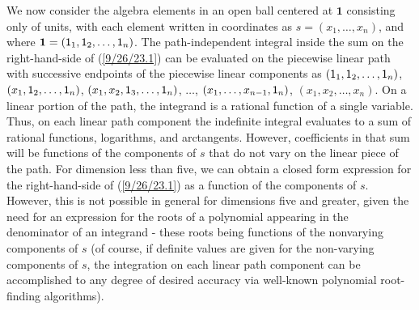 \documentclass{amsart}
\numberwithin{equation}{section}
\theoremstyle{definition}
\numberwithin{theorem}{section}
\begin{document}
We now consider the algebra elements in an open ball centered at $\mathbf{1}$ consisting only of units, with each element written in coordinates as $s = (x_1,\dots,x_n)$, and where $\mathbf{1} = ({\sf 1}_1,{\sf 1}_2,\dots,{\sf 1}_n)$.  The path-independent integral inside the sum on the right-hand-side of (\ref{9/26/23.1}) can be evaluated on the piecewise linear path with successive endpoints of the piecewise linear components as  $({\sf 1}_1,{\sf 1}_2,\dots,{\sf 1}_n)$, $(x_1,{\sf 1}_2,\dots,{\sf 1}_n)$, $(x_1,x_2,{\sf 1}_3,\dots,{\sf 1}_n)$,  $\dots$, $(x_1,\dots, x_{n-1}, {\sf 1}_n)$, $(x_1,x_2,\dots,x_n)$.    On a linear portion of the path, the integrand is a rational function of a single variable.  Thus, on each linear path component the indefinite integral evaluates to a sum of rational functions, logarithms, and arctangents.  However, coefficients in that sum will be functions of the components of $s$ that do not vary on the linear piece of the path.  For dimension less than five, we can obtain a closed form expression for the right-hand-side of (\ref{9/26/23.1}) as a function of the components of $s$.  However, this is not possible in general for dimensions five and greater, given the need for an expression for the roots of a polynomial appearing in the denominator of an integrand - these roots being functions of the nonvarying components of $s$ (of course, if definite values are given for the non-varying components of $s$, the integration on each linear path component can be accomplished to any degree of desired accuracy via well-known polynomial root-finding algorithms).
\end{document}

